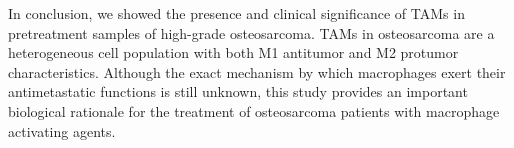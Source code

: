 In conclusion, we showed the presence and clinical
significance of TAMs in pretreatment samples of high\hyp{}grade
osteosarcoma. TAMs in osteosarcoma are a heterogeneous
cell population with both M1 antitumor and M2 protumor
characteristics. Although the exact mechanism by which
macrophages exert their antimetastatic functions is still
unknown, this study provides an important biological
rationale for the treatment of osteosarcoma patients with
macrophage activating agents.


\begin{small}
\begin{singlespace}

\end{singlespace}
\end{small}

%